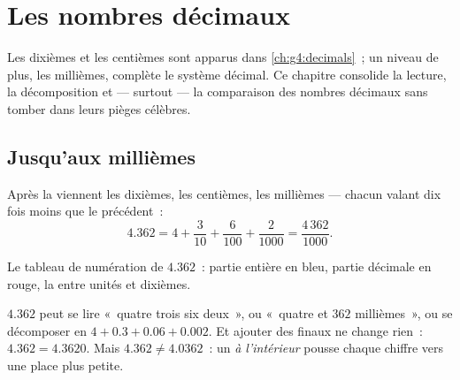 \chapter{Les nombres décimaux}\label{ch:g5:decimals}

Les dixièmes et les centièmes sont apparus dans
\cref{ch:g4:decimals}~; un niveau de plus, les millièmes, complète
le système décimal. Ce chapitre consolide la lecture, la
décomposition et --- surtout --- la comparaison des nombres
décimaux sans tomber dans leurs pièges célèbres.

\section{Jusqu'aux millièmes}

\begin{definition}\label{def:g5:decimals:places}
Après la  viennent les dixièmes, les centièmes, les
millièmes --- chacun valant dix fois moins que le précédent~:
\[
4.362 = 4 + \frac{3}{10} + \frac{6}{100} + \frac{2}{1000}
= \frac{4\,362}{1000}.
\]
\end{definition}

\begin{omfigure}

{\small Le tableau de numération de $4.362$~: partie entière en
bleu, partie décimale en rouge, la  entre unités et
dixièmes.}
\end{omfigure}

\begin{example}\label{ex:g5:decimals:readings}
$4.362$ peut se lire «~quatre  trois six deux~», ou «~quatre
et $362$ millièmes~», ou se décomposer en $4 + 0.3 + 0.06 + 0.002$.
Et ajouter des  finaux ne change rien~: $4.362 = 4.3620$.
Mais $4.362 \neq 4.0362$~: un  \emph{à l'intérieur} pousse
chaque chiffre vers une place plus petite.
\end{example}

